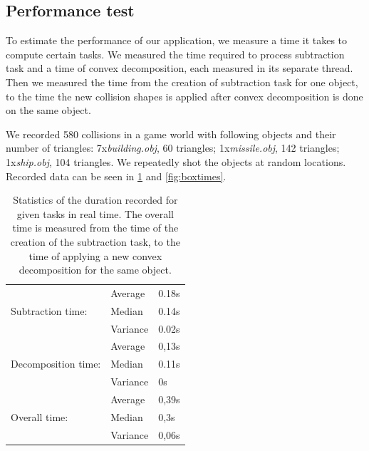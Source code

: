 \subsection{Performance test}
To estimate the performance of our application, we measure a time it takes to compute certain tasks. We measured the time required to process subtraction task and a time of convex decomposition, each measured in its separate thread. Then we measured the time from the creation of subtraction task for one object, to the time the new collision shapes is applied after convex decomposition is done on the same object.

We recorded 580 collisions in a game world with following objects and their number of triangles: 7x\emph{building.obj}, 60 triangles; 1x\emph{missile.obj}, 142 triangles; 1x\emph{ship.obj}, 104 triangles. We repeatedly shot the objects at random locations. Recorded data can be seen in \cref{tab:performace} and \cref{fig:boxtimes}.

\begin{table}
	\centering
  \begin{tabular}{lll}
  & Average & 0.18s \\
  Subtraction time: & Median & 0.14s \\
  & Variance & 0.02s \\
  \hline
  & Average & 0,13s \\
  Decomposition time: & Median & 0.11s \\
  & Variance & 0s \\
  \hline
  & Average & 0,39s \\
  Overall time:& Median & 0,3s \\
  & Variance & 0,06s \\
  \end{tabular}
  \caption{Statistics of the duration recorded for given tasks in real time. The overall time is measured from the time of the creation of the subtraction task, to the time of applying a new convex decomposition for the same object.}
  \label{tab:performace}
\end{table}


